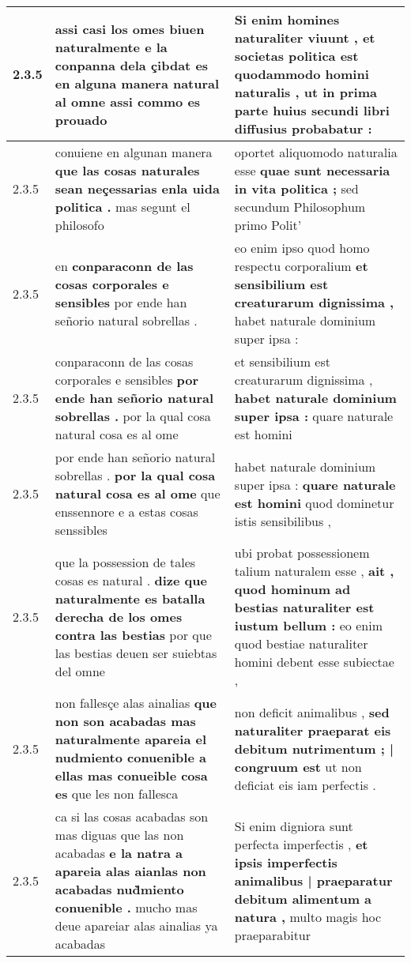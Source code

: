 \begin{tabular}{|p{1cm}|p{6.5cm}|p{6.5cm}|}
2.3.5 & assi casi los omes biuen naturalmente \textbf{ e la conpanna dela çibdat es en alguna manera natural al omne } assi commo es prouado & Si enim homines naturaliter viuunt , \textbf{ et societas politica est quodammodo homini naturalis , } ut in prima parte huius secundi libri diffusius probabatur : \\\hline
2.3.5 & conuiene en algunan manera \textbf{ que las cosas naturales sean neçessarias enla uida politica . } mas segunt el philosofo & oportet aliquomodo naturalia esse \textbf{ quae sunt necessaria in vita politica ; } sed secundum Philosophum primo Polit’ \\\hline
2.3.5 & en \textbf{ conparaconn de las cosas corporales e sensibles } por ende han señorio natural sobrellas . & eo enim ipso quod homo respectu corporalium \textbf{ et sensibilium est creaturarum dignissima , } habet naturale dominium super ipsa : \\\hline
2.3.5 & conparaconn de las cosas corporales e sensibles \textbf{ por ende han señorio natural sobrellas . } por la qual cosa natural cosa es al ome & et sensibilium est creaturarum dignissima , \textbf{ habet naturale dominium super ipsa : } quare naturale est homini \\\hline
2.3.5 & por ende han señorio natural sobrellas . \textbf{ por la qual cosa natural cosa es al ome } que enssennore e a estas cosas senssibles & habet naturale dominium super ipsa : \textbf{ quare naturale est homini } quod dominetur istis sensibilibus , \\\hline
2.3.5 & que la possession de tales cosas es natural . \textbf{ dize que naturalmente es batalla derecha de los omes contra las bestias } por que las bestias deuen ser suiebtas del omne & ubi probat possessionem talium naturalem esse , \textbf{ ait , quod hominum ad bestias naturaliter est iustum bellum : } eo enim quod bestiae naturaliter homini debent esse subiectae , \\\hline
2.3.5 & non fallesçe alas ainalias \textbf{ que non son acabadas mas naturalmente apareia el nudmiento conuenible a ellas mas conueible cosa es } que les non fallesca & non deficit animalibus , \textbf{ sed naturaliter praeparat eis debitum nutrimentum ; | congruum est } ut non deficiat eis iam perfectis . \\\hline
2.3.5 & ca si las cosas acabadas son mas diguas que las non acabadas \textbf{ e la natra a apareia alas aianlas non acabadas nud̀miento conuenible . } mucho mas deue apareiar alas ainalias ya acabadas & Si enim digniora sunt perfecta imperfectis , \textbf{ et ipsis imperfectis animalibus | praeparatur debitum alimentum a natura , } multo magis hoc praeparabitur \\\hline

\end{tabular}
